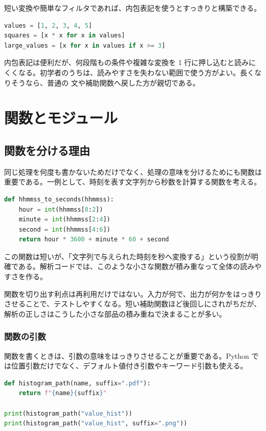 短い変換や簡単なフィルタであれば、内包表記を使うとすっきりと構築できる。

\begin{lstlisting}[language=Python]
values = [1, 2, 3, 4, 5]
squares = [x * x for x in values]
large_values = [x for x in values if x >= 3]
\end{lstlisting}

内包表記は便利だが、何段階もの条件や複雑な変換を 1 行に押し込むと読みにくくなる。初学者のうちは、読みやすさを失わない範囲で使う方がよい。長くなりそうなら、普通の  文や補助関数へ戻した方が親切である。

\section{関数とモジュール}

\subsection{関数を分ける理由}

同じ処理を何度も書かないためだけでなく、処理の意味を分けるためにも関数は重要である。一例として、時刻を表す文字列から秒数を計算する関数を考える。

\begin{lstlisting}[language=Python]
def hhmmss_to_seconds(hhmmss):
    hour = int(hhmmss[0:2])
    minute = int(hhmmss[2:4])
    second = int(hhmmss[4:6])
    return hour * 3600 + minute * 60 + second
\end{lstlisting}

この関数は短いが、「文字列で与えられた時刻を秒へ変換する」という役割が明確である。解析コードでは、このような小さな関数が積み重なって全体の読みやすさを作る。

関数を切り出す利点は再利用だけではない。入力が何で、出力が何かをはっきりさせることで、テストしやすくなる。短い補助関数ほど後回しにされがちだが、解析の正しさはこうした小さな部品の積み重ねで決まることが多い。

\subsubsection{関数の引数}

関数を書くときは、引数の意味をはっきりさせることが重要である。Python では位置引数だけでなく、デフォルト値付き引数やキーワード引数も使える。

\begin{lstlisting}[language=Python]
def histogram_path(name, suffix=".pdf"):
    return f"{name}{suffix}"

print(histogram_path("value_hist"))
print(histogram_path("value_hist", suffix=".png"))
\end{lstlisting}

